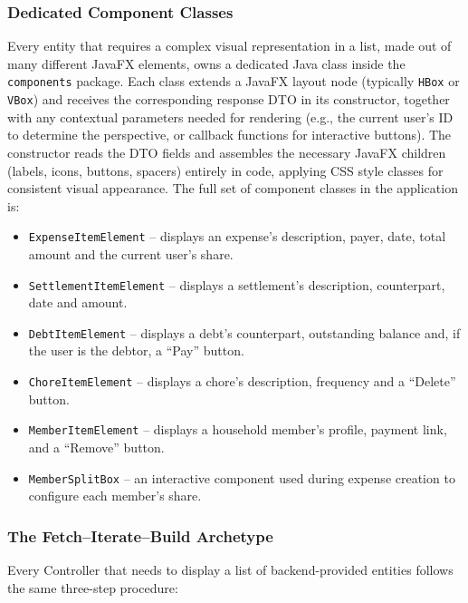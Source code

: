 \subsubsection{Dedicated Component Classes}

Every entity that requires a complex visual representation in a list, made out of many different JavaFX elements, owns a dedicated Java class inside the \texttt{components} package. Each class extends a JavaFX layout node (typically \texttt{HBox} or \texttt{VBox}) and receives the corresponding response DTO in its constructor, together with any contextual parameters needed for rendering (e.g., the current user's ID to determine the perspective, or callback functions for interactive buttons). The constructor reads the DTO fields and assembles the necessary JavaFX children (labels, icons, buttons, spacers) entirely in code, applying CSS style classes for consistent visual appearance. The full set of component classes in the application is:

\begin{itemize}
    \item \texttt{ExpenseItemElement} -- displays an expense's description, payer, date, total amount and the current user's share.
    \item \texttt{SettlementItemElement} -- displays a settlement's description, counterpart, date and amount.
    \item \texttt{DebtItemElement} -- displays a debt's counterpart, outstanding balance and, if the user is the debtor, a ``Pay'' button.
    \item \texttt{ChoreItemElement} -- displays a chore's description, frequency and a ``Delete'' button.
    \item \texttt{MemberItemElement} -- displays a household member's profile, payment link, and a ``Remove'' button.
    \item \texttt{MemberSplitBox} -- an interactive component used during expense creation to configure each member's share.
\end{itemize}

\subsubsection{The Fetch--Iterate--Build Archetype}

Every Controller that needs to display a list of backend-provided entities follows the same three-step procedure:

